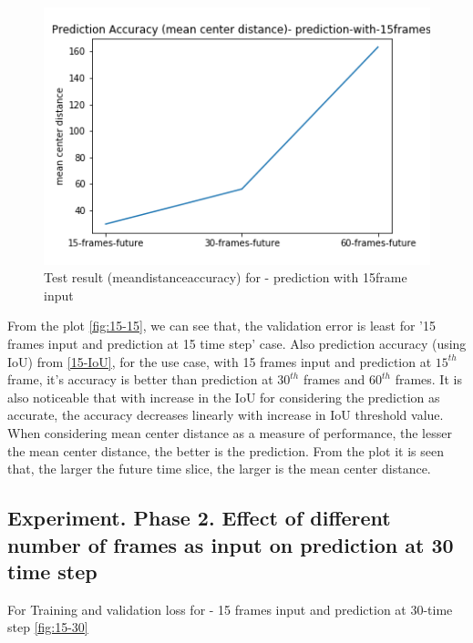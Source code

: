 \begin{figure}[H] 
\includegraphics[scale=0.8]{prediction-with-15frames-mean_distance_accuracy}
\begin{center}
\caption{Test result (mean\textunderscore distance\textunderscore accuracy) for - prediction with 15frame input }
\label{15-mcd}
\end{center}
\end{figure}

From the plot \ref{fig:15-15}, we can see that, the validation error is least for '15 frames input and prediction at 15 time step' case. Also prediction accuracy (using IoU) from \ref{15-IoU}, for the use case, with 15 frames input and prediction at $15^{th}$ frame, it's accuracy is better than prediction at $30^{th}$ frames and $60^{th}$ frames. It is also noticeable that with increase in the IoU for considering the prediction as accurate, the accuracy decreases linearly with increase in IoU threshold value. When considering mean center distance as a measure of performance, the lesser the mean center distance, the better is the prediction. From the plot it is seen that, the larger the future time slice, the larger is the mean center distance.

\subsection{Experiment. Phase 2. Effect of different number of frames as input on prediction at 30  time step}
For Training and validation loss for - 15 frames input and prediction at 30-time step \ref{fig:15-30}

